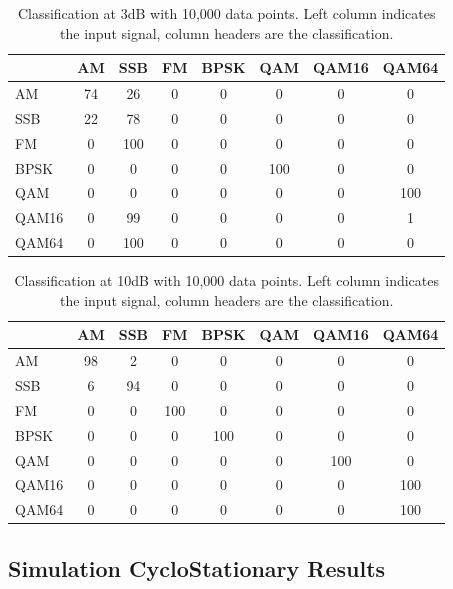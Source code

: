 \begin{table}
\centering
\caption{Classification at 3dB with 10,000 data points.  Left column indicates
the input signal, column headers are the classification.}
\begin{tabular}{ l | c | c | c | c | c | c | c } \hline
      &  AM  &  SSB & FM & BPSK & QAM & QAM16 & QAM64 \\ \hline \hline 
AM    &	 74 &	 26 &	 0 &	 0 &	 0 &	 0 &	 0 \\ \hline  
SSB   &	 22 &	 78 &	 0 &	 0 &	 0 &	 0 &	 0 \\ \hline  
FM    &	 0 &	 100 &	 0 &	 0 &	 0 &	 0 &	 0 \\ \hline  
BPSK  &	 0 &	 0 &	 0 &	 0 &	 100 &	 0 &	 0 \\ \hline  
QAM   &	 0 &	 0 &	 0 &	 0 &	 0 &	 0 &	 100 \\ \hline 
QAM16 &	 0 &	 99 &	 0 &	 0 &	 0 &	 0 &	 1 \\ \hline  
QAM64 &	 0 &	 100 &	 0 &	 0 &	 0 &	 0 &	 0 \\ \hline 
\end{tabular}
\label{tab:cumFalsePosTable3dB}
\end{table}

\begin{table}
\centering
\caption{Classification at 10dB with 10,000 data points.  Left column indicates
the input signal, column headers are the classification.}
\begin{tabular}{ l | c | c | c | c | c | c | c } \hline
      &  AM  &  SSB & FM & BPSK & QAM & QAM16 & QAM64 \\ \hline \hline 
AM    &	 98 &	 2 &	 0 &	 0 &	 0 &	 0 &	 0 \\ \hline \hline 
SSB   &	 6 &	 94 &	 0 &	 0 &	 0 &	 0 &	 0 \\ \hline 
FM    &	 0 &	 0 &	 100 &	 0 &	 0 &	 0 &	 0 \\ \hline  
BPSK  &	 0 &	 0 &	 0 &	 100 &	 0 &	 0 &	 0 \\ \hline  
QAM   &	 0 &	 0 &	 0 &	 0 &	 0 &	 100 &	 0 \\ \hline  
QAM16 &	 0 &	 0 &	 0 &	 0 &	 0 &	 0 &	 100 \\ \hline 
QAM64 &	 0 &	 0 &	 0 &	 0 &	 0 &	 0 &	 100 \\ \hline 
\end{tabular}
\label{tab:cumFalsePosTable10dB}
\end{table}

\newpage
\subsection*{Simulation CycloStationary Results}


